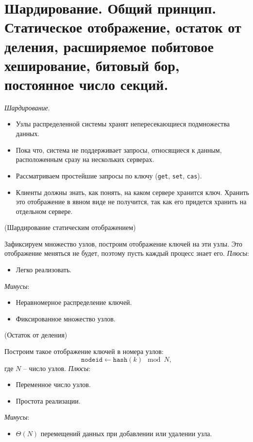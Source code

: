 \section{Шардирование. Общий принцип. Статическое отображение,
остаток от деления, расширяемое побитовое хеширование, битовый бор,
постоянное число секций.}

\begin{definition}
    \textit{Шардирование}.
    \begin{itemize}
        \item Узлы распределенной системы хранят непересекающиеся
            подмножества данных.
        \item Пока что, система не поддерживает запросы, относящиеся к данным,
            расположенным сразу на нескольких серверах.
        \item Рассматриваем простейшие запросы по ключу (\texttt{get}, \texttt{set},
            \texttt{cas}).
        \item Клиенты должны знать, как понять, на каком сервере хранится ключ.
            Хранить это отображение в явном виде не получится, так как его придется
            хранить на отдельном сервере.
    \end{itemize}
\end{definition}

\begin{algorithm}(Шардирование статическим отображением)

    Зафиксируем множество узлов, построим отображение ключей на эти узлы.
    Это отображение меняться не будет, поэтому пусть каждый процесс знает его.
    \textit{Плюсы}:
    \begin{itemize}
        \item Легко реализовать.
    \end{itemize}
    \textit{Минусы}:
    \begin{itemize}
        \item Неравномерное распределение ключей.
        \item Фиксированное множество узлов.
    \end{itemize}
\end{algorithm}

\begin{algorithm}(Остаток от деления)

    Построим такое отображение ключей в номера узлов:
    \[
        \texttt{nodeid} \leftarrow \texttt{hash}(k) \mod N
    ,\]
    где $N$ -- число узлов.
    \textit{Плюсы}:
    \begin{itemize}
        \item Переменное число узлов.
        \item Простота реализации.
    \end{itemize}
    \textit{Минусы}:
    \begin{itemize}
        \item $\Theta(N)$ перемещений данных при добавлении или удалении узла.
    \end{itemize}
\end{algorithm}

